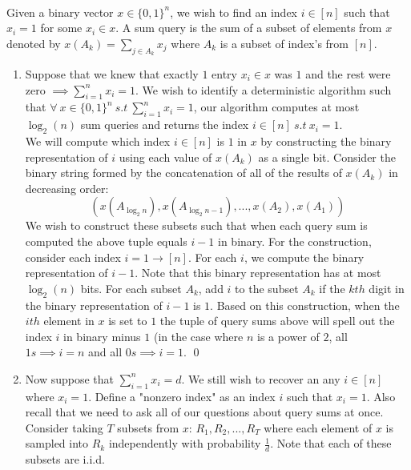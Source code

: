 \documentclass[12pt]{article}
\begin{document}
\begin{solution} \ \\
Given a binary vector $x \in \{0,1\}^n$, we wish to find an index $i\in [n]$ such that $x_i=1$ for some $x_i\in x$. A sum query is the sum of a subset of elements from $x$ denoted by $x(A_k) = \sum_{j\in A_k}{x_j}$ where $A_k$ is a subset of index's from $[n]$.

\begin{enumerate}[label=(\alph*)]
\item Suppose that we knew that exactly $1$ entry $x_i \in x$ was $1$ and the rest were zero $\implies \sum_{i=1}^{n}{x_i} = 1$. We wish to identify a deterministic algorithm such that $\forall~x\in \{0,1\}^n ~s.t~\sum_{i=1}^{n}{x_i} = 1$, our algorithm computes at most $\log_2(n)$ sum queries and returns the index $i\in [n]~s.t~x_i=1$.\\

We will compute which index $i\in [n]$ is $1$ in $x$ by constructing the binary representation of $i$ using each value of $x(A_k)$ as a single bit. Consider the binary string formed by the concatenation of all of the results of $x(A_k)$ in decreasing order:
\[
(x(A_{\log_{2}{n}}), x(A_{\log_2{n}-1}), ..., x(A_{2}),x(A_{1}))
\]
We wish to construct these subsets such that when each query sum is computed the above tuple equals $i-1$ in binary. For the construction, consider each index $i=1\rightarrow [n]$. For each $i$, we compute the binary representation of $i-1$. Note that this binary representation has at most $\log_{2}(n)$ bits. For each subset $A_k$, add $i$ to the subset $A_k$ if the $kth$ digit in the binary representation of $i-1$ is $1$. Based on this construction, when the $ith$ element in $x$ is set to $1$ the tuple of query sums above will spell out the index $i$ in binary minus $1$ (in the case where $n$ is a power of $2$, all $1s  \implies i=n$ and all $0s \implies i=1$. \qed

\item Now suppose that $\sum_{i=1}^{n}{x_i} = d$. We still wish to recover an any $i\in [n]$ where $x_i=1$. Define a "nonzero index" as an index $i$ such that $x_i=1$. Also recall that we need to ask all of our questions about query sums at once. Consider taking $T$ subsets from $x$: $R_1, R_2, ..., R_T$ where   each element of $x$ is sampled into $R_k$ independently with probability $\frac{1}{d}$. Note that each of these subsets are i.i.d. 


\end{enumerate}
\end{solution}
\end{document}
